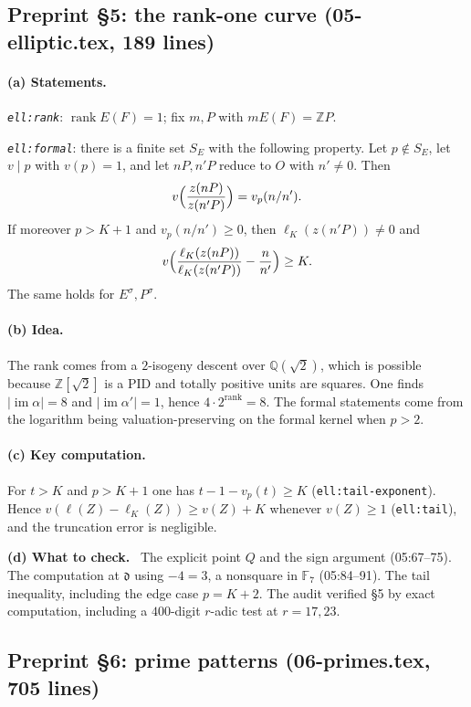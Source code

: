 \documentclass[11pt]{article}
\theoremstyle{definition}
\newcommand{\Q}{\mathbb Q}
\newcommand{\Z}{\mathbb Z}
\newcommand{\F}{\mathbb F}
\newcommand{\lbl}[1]{\texttt{#1}}
\newcommand{\src}[1]{\textsf{#1}}
\DeclareMathOperator{\rank}{rank}
\newcommand{\checkhead}{\par\smallskip\noindent\textbf{(d) What to check.}\ }
\begin{document}
\subsection{Preprint \S5: the rank-one curve (\src{05-elliptic.tex}, 189 lines)}

\paragraph{(a) Statements.}
\emph{\lbl{ell:rank}}: $\rank E(F)=1$; fix $m,P$ with $mE(F)=\Z P$.

\emph{\lbl{ell:formal}}: there is a finite set $S_E$ with the following
property.  Let $p\notin S_E$, let $v\mid p$ with $v(p)=1$, and let
$nP,n'P$ reduce to $O$ with $n'\ne0$.  Then
\[
 v\Bigl(\frac{z(nP)}{z(n'P)}\Bigr)=v_p(n/n').
\]
If moreover $p>K+1$ and $v_p(n/n')\ge0$, then $\ell_K(z(n'P))\ne0$ and
\[
 v\Bigl(\frac{\ell_K(z(nP))}{\ell_K(z(n'P))}-\frac n{n'}\Bigr)\ge K.
\]
The same holds for $E^\sigma,P^\sigma$.

\paragraph{(b) Idea.}
The rank comes from a $2$-isogeny descent over $\Q(\sqrt2)$, which is
possible because $\Z[\sqrt2]$ is a PID and totally positive units are
squares.  One finds $|\operatorname{im}\alpha|=8$ and
$|\operatorname{im}\alpha'|=1$, hence $4\cdot2^{\rank}=8$.  The formal
statements come from the logarithm being valuation-preserving on the
formal kernel when $p>2$.

\paragraph{(c) Key computation.}
For $t>K$ and $p>K+1$ one has $t-1-v_p(t)\ge K$ (\lbl{ell:tail-exponent}).
Hence $v(\ell(Z)-\ell_K(Z))\ge v(Z)+K$ whenever $v(Z)\ge1$
(\lbl{ell:tail}), and the truncation error is negligible.

\checkhead
The explicit point $Q$ and the sign argument (\src{05:67--75}).  The
computation at $\mathfrak d$ using $-4=3$, a nonsquare in $\F_7$
(\src{05:84--91}).  The tail inequality, including the edge case $p=K+2$.
The audit verified \S5 by exact computation, including a $400$-digit
$r$-adic test at $r=17,23$.

\subsection{Preprint \S6: prime patterns (\src{06-primes.tex}, 705 lines)}
\end{document}
